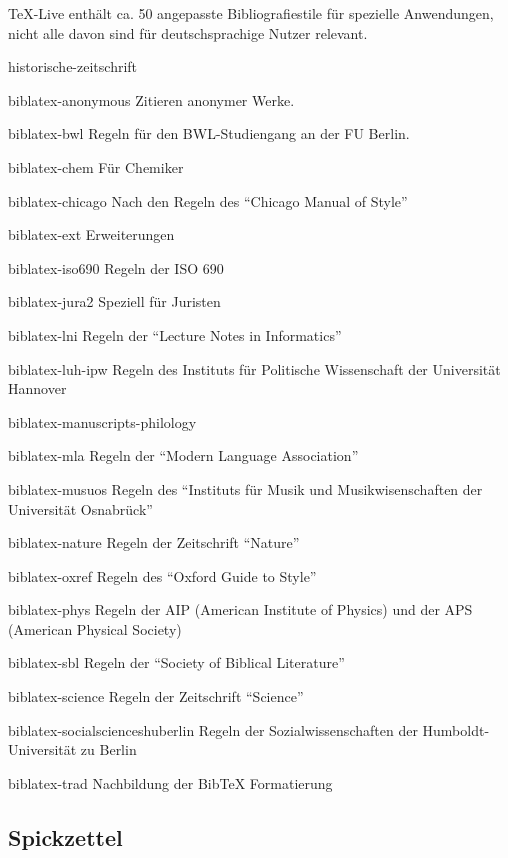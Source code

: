 TeX-Live enthält ca. 50 angepasste Bibliografiestile für spezielle Anwendungen, 
nicht alle davon sind für deutschsprachige Nutzer relevant.


\begin{labeling}{historische-zeitschrift}
\item[biblatex-anonymous] Zitieren anonymer Werke.
\item[biblatex-bwl]       Regeln für den BWL-Studiengang an der FU Berlin.
\item[biblatex-chem]      Für Chemiker
\item[biblatex-chicago]   Nach den Regeln des \enquote{Chicago Manual of
  Style}
\item[biblatex-ext]       \biblatex{} Erweiterungen
\item[biblatex-iso690]    Regeln der ISO 690
\item[biblatex-jura2]     Speziell für Juristen
\item[biblatex-lni]       Regeln der \enquote{Lecture Notes in Informatics}
\item[biblatex-luh-ipw]   Regeln des Instituts für Politische Wissenschaft der Universität Hannover
\item[biblatex-manuscripts-philology]
\item[biblatex-mla]       Regeln der \enquote{Modern Language Association}
\item[biblatex-musuos]    Regeln des \enquote{Instituts für Musik und
  Musikwisenschaften der Universität Osnabrück}
\item[biblatex-nature]    Regeln der Zeitschrift \enquote{Nature}
\item[biblatex-oxref]     Regeln des \enquote{Oxford Guide to Style}
\item[biblatex-phys]      Regeln der AIP (American Institute of Physics) und der APS (American Physical Society)
\item[biblatex-sbl]       Regeln der \enquote{Society of Biblical Literature}
\item[biblatex-science]   Regeln der Zeitschrift \enquote{Science}
\item[biblatex-socialscienceshuberlin] Regeln der Sozialwissenschaften der Humboldt-Universität zu Berlin
\item[biblatex-trad]      Nachbildung der BibTeX Formatierung
\end{labeling}

\subsection{Spickzettel}

